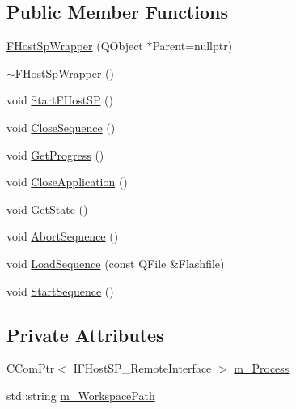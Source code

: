 \subsection*{Public Member Functions}
\begin{DoxyCompactItemize}
\item 
\hyperlink{class_r_w_1_1_c_o_r_e_1_1_f_host_sp_wrapper_ae333b04fe313284ac0a4a7b872e31b83}{F\+Host\+Sp\+Wrapper} (Q\+Object $\ast$Parent=nullptr)
\item 
\hyperlink{class_r_w_1_1_c_o_r_e_1_1_f_host_sp_wrapper_a5d596866de0091d77fbcab7fb557faae}{$\sim$\+F\+Host\+Sp\+Wrapper} ()
\item 
void \hyperlink{class_r_w_1_1_c_o_r_e_1_1_f_host_sp_wrapper_ad2daebbd1b0140480d03b31916cd6c35}{Start\+F\+Host\+SP} ()
\item 
void \hyperlink{class_r_w_1_1_c_o_r_e_1_1_f_host_sp_wrapper_abfbe1c65f2383e10da83dfd1ab5825f0}{Close\+Sequence} ()
\item 
void \hyperlink{class_r_w_1_1_c_o_r_e_1_1_f_host_sp_wrapper_ad586b9e7711a788688322ee7d54b0320}{Get\+Progress} ()
\item 
void \hyperlink{class_r_w_1_1_c_o_r_e_1_1_f_host_sp_wrapper_a00ff512e1699742a7908540c11be1e40}{Close\+Application} ()
\item 
void \hyperlink{class_r_w_1_1_c_o_r_e_1_1_f_host_sp_wrapper_ad173aae317d00608bc92d826e5befe64}{Get\+State} ()
\item 
void \hyperlink{class_r_w_1_1_c_o_r_e_1_1_f_host_sp_wrapper_ad95d9017361d78c466afaf3c2bd391ee}{Abort\+Sequence} ()
\item 
void \hyperlink{class_r_w_1_1_c_o_r_e_1_1_f_host_sp_wrapper_a5d384a433b333b1f5f7b7465ad138d4c}{Load\+Sequence} (const Q\+File \&Flashfile)
\item 
void \hyperlink{class_r_w_1_1_c_o_r_e_1_1_f_host_sp_wrapper_a718318bc9b98f97ff311f8174adfb172}{Start\+Sequence} ()
\end{DoxyCompactItemize}
\subsection*{Private Attributes}
\begin{DoxyCompactItemize}
\item 
C\+Com\+Ptr$<$ I\+F\+Host\+S\+P\+\_\+\+Remote\+Interface $>$ \hyperlink{class_r_w_1_1_c_o_r_e_1_1_f_host_sp_wrapper_a85c312c5d8288140d1d2a31fd15946a9}{m\+\_\+\+Process}
\item 
std\+::string \hyperlink{class_r_w_1_1_c_o_r_e_1_1_f_host_sp_wrapper_a3760e496eac5633321be3f2345b86b88}{m\+\_\+\+Workspace\+Path}
\end{DoxyCompactItemize}
